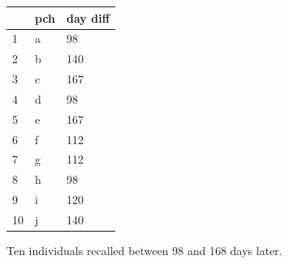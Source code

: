%

\begin{table}[ht]
\centering
\begin{tabular}{lll}
  \hline
         &  pch & day diff \\
  \hline
1        &  a   & 98 \\
2        &  b   & 140 \\
3        &  c   & 167 \\
4        &  d   & 98 \\
5        &  e   & 167 \\
6        &  f   & 112 \\
7        &  g   & 112 \\
8        &  h   & 98 \\
9        &  i   & 120 \\
10       &  j   & 140 \\
   \hline
\end{tabular}
{Ten individuals recalled between 98 and 168 days later. }
{
}
\end{table}




